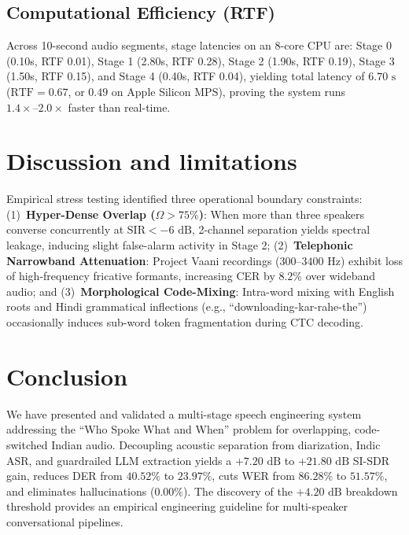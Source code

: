 \documentclass[11pt,a4paper,twocolumn]{article}
\begin{document}
\subsection{Computational Efficiency (RTF)}
Across 10-second audio segments, stage latencies on an 8-core CPU are: Stage 0 (0.10s, RTF 0.01), Stage 1 (2.80s, RTF 0.28), Stage 2 (1.90s, RTF 0.19), Stage 3 (1.50s, RTF 0.15), and Stage 4 (0.40s, RTF 0.04), yielding total latency of $6.70\text{ s}$ ($\text{RTF} = 0.67$, or $0.49$ on Apple Silicon MPS), proving the system runs $1.4\times\text{--}2.0\times$ faster than real-time.

\section{Discussion and limitations}
Empirical stress testing identified three operational boundary constraints: (1)~\textbf{Hyper-Dense Overlap ($\Omega > 75\%$)}: When more than three speakers converse concurrently at $\text{SIR} < -6\text{ dB}$, 2-channel separation yields spectral leakage, inducing slight false-alarm activity in Stage 2; (2)~\textbf{Telephonic Narrowband Attenuation}: Project Vaani recordings ($300\text{--}3400\text{ Hz}$) exhibit loss of high-frequency fricative formants, increasing CER by $8.2\%$ over wideband audio; and (3)~\textbf{Morphological Code-Mixing}: Intra-word mixing with English roots and Hindi grammatical inflections (e.g., ``downloading-kar-rahe-the'') occasionally induces sub-word token fragmentation during CTC decoding.

\section{Conclusion}
We have presented and validated a multi-stage speech engineering system addressing the ``Who Spoke What and When'' problem for overlapping, code-switched Indian audio. Decoupling acoustic separation from diarization, Indic ASR, and guardrailed LLM extraction yields a $+7.20\text{ dB}$ to $+21.80\text{ dB}$ SI-SDR gain, reduces DER from $40.52\%$ to $23.97\%$, cuts WER from $86.28\%$ to $51.57\%$, and eliminates hallucinations ($0.00\%$). The discovery of the $+4.20\text{ dB}$ breakdown threshold provides an empirical engineering guideline for multi-speaker conversational pipelines.
\end{document}
